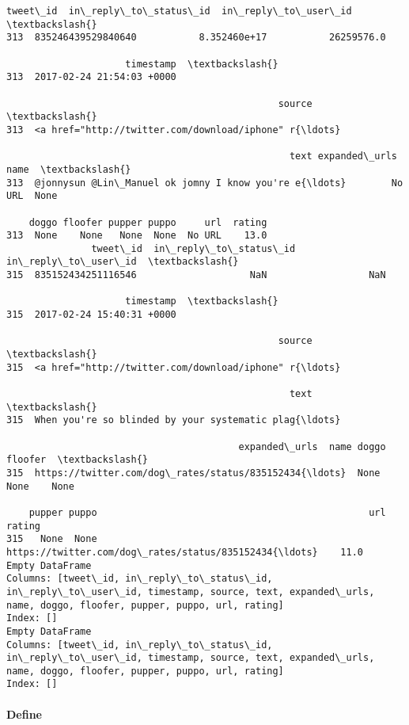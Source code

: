 \documentclass[11pt]{article}
\begin{document}
    \begin{Verbatim}[commandchars=\\\{\}]
               tweet\_id  in\_reply\_to\_status\_id  in\_reply\_to\_user\_id  \textbackslash{}
313  835246439529840640           8.352460e+17           26259576.0   

                     timestamp  \textbackslash{}
313  2017-02-24 21:54:03 +0000   

                                                source  \textbackslash{}
313  <a href="http://twitter.com/download/iphone" r{\ldots}   

                                                  text expanded\_urls  name  \textbackslash{}
313  @jonnysun @Lin\_Manuel ok jomny I know you're e{\ldots}        No URL  None   

    doggo floofer pupper puppo     url  rating  
313  None    None   None  None  No URL    13.0  
               tweet\_id  in\_reply\_to\_status\_id  in\_reply\_to\_user\_id  \textbackslash{}
315  835152434251116546                    NaN                  NaN   

                     timestamp  \textbackslash{}
315  2017-02-24 15:40:31 +0000   

                                                source  \textbackslash{}
315  <a href="http://twitter.com/download/iphone" r{\ldots}   

                                                  text  \textbackslash{}
315  When you're so blinded by your systematic plag{\ldots}   

                                         expanded\_urls  name doggo floofer  \textbackslash{}
315  https://twitter.com/dog\_rates/status/835152434{\ldots}  None  None    None   

    pupper puppo                                                url  rating  
315   None  None  https://twitter.com/dog\_rates/status/835152434{\ldots}    11.0  
Empty DataFrame
Columns: [tweet\_id, in\_reply\_to\_status\_id, in\_reply\_to\_user\_id, timestamp, source, text, expanded\_urls, name, doggo, floofer, pupper, puppo, url, rating]
Index: []
Empty DataFrame
Columns: [tweet\_id, in\_reply\_to\_status\_id, in\_reply\_to\_user\_id, timestamp, source, text, expanded\_urls, name, doggo, floofer, pupper, puppo, url, rating]
Index: []

    \end{Verbatim}

    \paragraph{Define}\label{define}
\end{document}
